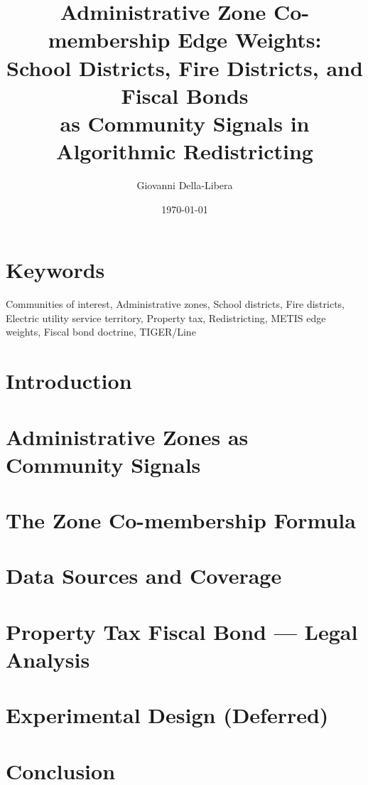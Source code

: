 \documentclass[12pt]{article}
\title{\textbf{Administrative Zone Co-membership Edge Weights:\\
School Districts, Fire Districts, and Fiscal Bonds\\
as Community Signals in Algorithmic Redistricting}}
\author{Giovanni Della-Libera}
\date{\today}
\begin{document}
\maketitle

\begin{abstract}

\end{abstract}

\section*{Keywords}
Communities of interest, Administrative zones, School districts, Fire districts,
Electric utility service territory, Property tax, Redistricting, METIS edge weights,
Fiscal bond doctrine, TIGER/Line

\section{Introduction}


\section{Administrative Zones as Community Signals}


\section{The Zone Co-membership Formula}


\section{Data Sources and Coverage}


\section{Property Tax Fiscal Bond --- Legal Analysis}


\section{Experimental Design (Deferred)}


\section{Conclusion}




\end{document}
